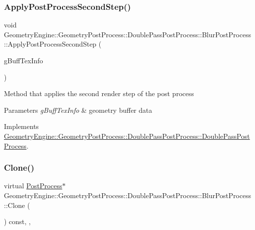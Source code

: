 \subsubsection{\texorpdfstring{ApplyPostProcessSecondStep()}{ApplyPostProcessSecondStep()}}
{\footnotesize\ttfamily void Geometry\+Engine\+::\+Geometry\+Post\+Process\+::\+Double\+Pass\+Post\+Process\+::\+Blur\+Post\+Process\+::\+Apply\+Post\+Process\+Second\+Step (\begin{DoxyParamCaption}\item[{const \mbox{\hyperlink{class_geometry_engine_1_1_g_buffer_texture_info}{G\+Buffer\+Texture\+Info}} \&}]{g\+Buff\+Tex\+Info }\end{DoxyParamCaption})\hspace{0.3cm}{\ttfamily [virtual]}}

Method that applies the second render step of the post process 
\begin{DoxyParams}{Parameters}
{\em g\+Buff\+Tex\+Info} & geometry buffer data \\
\hline
\end{DoxyParams}


Implements \mbox{\hyperlink{class_geometry_engine_1_1_geometry_post_process_1_1_double_pass_post_process_1_1_double_pass_post_process_a2818082bfbcbacf9ccb0e1b2059c24e8}{Geometry\+Engine\+::\+Geometry\+Post\+Process\+::\+Double\+Pass\+Post\+Process\+::\+Double\+Pass\+Post\+Process}}.

\mbox{\label{class_geometry_engine_1_1_geometry_post_process_1_1_double_pass_post_process_1_1_blur_post_process_a4399f435326724c64cf255a40479d330}} 
\subsubsection{\texorpdfstring{Clone()}{Clone()}}
{\footnotesize\ttfamily virtual \mbox{\hyperlink{class_geometry_engine_1_1_geometry_post_process_1_1_post_process}{Post\+Process}}$\ast$ Geometry\+Engine\+::\+Geometry\+Post\+Process\+::\+Double\+Pass\+Post\+Process\+::\+Blur\+Post\+Process\+::\+Clone (\begin{DoxyParamCaption}{ }\end{DoxyParamCaption}) const\hspace{0.3cm}{\ttfamily [inline]}, {\ttfamily [override]}, {\ttfamily [virtual]}}

